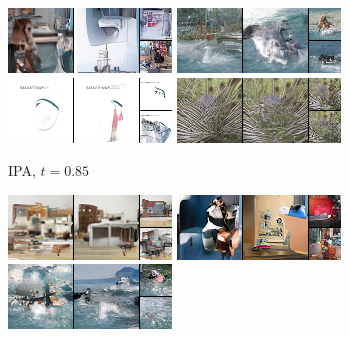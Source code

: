 \begin{figure}[t]
\begin{subfigure}[t]{0.2\textwidth}
      \includegraphics[height=\imagenetimgheight]{figs/cigcvae/image-samples/imagenet64/freeform_aipo_1_t=0.85_samples.png}
      \includegraphics[height=\imagenetimgheight]{figs/cigcvae/image-samples/imagenet64/freeform_aipo_2_t=0.85_samples.png}
      \includegraphics[height=\imagenetimgheight]{figs/cigcvae/image-samples/imagenet64/freeform_aipo_3_t=0.85_samples.png}
      \includegraphics[height=\imagenetimgheight]{figs/cigcvae/image-samples/imagenet64/freeform_aipo_4_t=0.85_samples.png}
      \caption{\scriptsize IPA, $t=0.85$}
    \end{subfigure}
    \begin{subfigure}[t]{0.2\textwidth}
      \centering
      \includegraphics[height=\imagenetimgheight]{figs/cigcvae/image-samples/imagenet64/freeform_aipo_0_samples.png}
      \includegraphics[height=\imagenetimgheight]{figs/cigcvae/image-samples/imagenet64/freeform_aipo_1_samples.png}
      \includegraphics[height=\imagenetimgheight]{figs/cigcvae/image-samples/imagenet64/freeform_aipo_2_samples.png}

\end{subfigure}
\end{figure}

